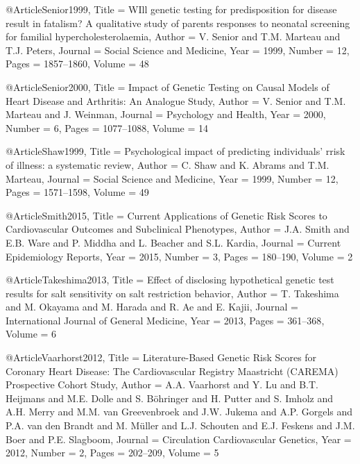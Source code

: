 @Article{Senior1999,
  Title                    = {WIll genetic testing for predisposition for disease result in fatalism? A qualitative study of parents responses to neonatal screening for familial hypercholesterolaemia},
  Author                   = {V. Senior and T.M. Marteau and T.J. Peters},
  Journal                  = {Social Science and Medicine},
  Year                     = {1999},
  Number                   = {12},
  Pages                    = {1857--1860},
  Volume                   = {48}
}

@Article{Senior2000,
  Title                    = {Impact of Genetic Testing on Causal Models of Heart Disease and Arthritis: An Analogue Study},
  Author                   = {V. Senior and T.M. Marteau and J. Weinman},
  Journal                  = {Psychology and Health},
  Year                     = {2000},
  Number                   = {6},
  Pages                    = {1077--1088},
  Volume                   = {14}
}

@Article{Shaw1999,
  Title                    = {Psychological impact of predicting individuals' rrisk of illness: a systematic review},
  Author                   = {C. Shaw and K. Abrams and T.M. Marteau},
  Journal                  = {Social Science and Medicine},
  Year                     = {1999},
  Number                   = {12},
  Pages                    = {1571--1598},
  Volume                   = {49}
}

@Article{Smith2015,
  Title                    = {Current Applications of Genetic Risk Scores to Cardiovascular Outcomes and Subclinical Phenotypes},
  Author                   = {J.A. Smith and E.B. Ware and P. Middha and L. Beacher and S.L. Kardia},
  Journal                  = {Current Epidemiology Reports},
  Year                     = {2015},
  Number                   = {3},
  Pages                    = {180--190},
  Volume                   = {2}
}

@Article{Takeshima2013,
  Title                    = {Effect of disclosing hypothetical genetic test results for salt sensitivity on salt restriction behavior},
  Author                   = {T. Takeshima and M. Okayama and M. Harada and R. Ae and E. Kajii},
  Journal                  = {International Journal of General Medicine},
  Year                     = {2013},
  Pages                    = {361--368},
  Volume                   = {6}
}

@Article{Vaarhorst2012,
  Title                    = {Literature-Based Genetic Risk Scores for Coronary Heart Disease: The Cardiovascular Registry Maastricht (CAREMA) Prospective Cohort Study},
  Author                   = {A.A. Vaarhorst and Y. Lu and B.T. Heijmans and M.E. Dolle and S. Böhringer and H. Putter and S. Imholz and A.H. Merry and M.M. van Greevenbroek and J.W. Jukema and A.P. Gorgels and P.A. van den Brandt and M. Müller and L.J. Schouten and E.J. Feskens and J.M. Boer and P.E. Slagboom},
  Journal                  = {Circulation Cardiovascular Genetics},
  Year                     = {2012},
  Number                   = {2},
  Pages                    = {202--209},
  Volume                   = {5}
}

